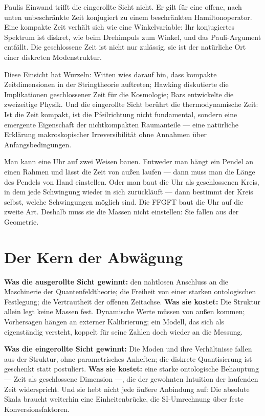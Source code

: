 Paulis Einwand trifft die eingerollte Sicht nicht. Er gilt für eine
offene, nach unten unbeschränkte Zeit konjugiert zu einem beschränkten
Hamiltonoperator. Eine kompakte Zeit verhält sich wie eine
Winkelvariable: Ihr konjugiertes Spektrum ist diskret, wie beim
Drehimpuls zum Winkel, und das Pauli-Argument entfällt. Die
geschlossene Zeit ist nicht nur zulässig, sie ist der natürliche Ort
einer diskreten Modenstruktur.

Diese Einsicht hat Wurzeln: Witten wies darauf hin, dass kompakte
Zeitdimensionen in der Stringtheorie auftreten; Hawking diskutierte die
Implikationen geschlossener Zeit für die Kosmologie; Bars entwickelte
die zweizeitige Physik. Und die eingerollte Sicht berührt die
thermodynamische Zeit: Ist die Zeit kompakt, ist die Pfeilrichtung nicht
fundamental, sondern eine emergente Eigenschaft der nichtkompakten
Raumanteile --- eine natürliche Erklärung makroskopischer
Irreversibilität ohne Annahmen über Anfangsbedingungen.

\begin{laierspur}
Man kann eine Uhr auf zwei Weisen bauen. Entweder man hängt ein
Pendel an einen Rahmen und lässt die Zeit von außen laufen --- dann
muss man die Länge des Pendels von Hand einstellen. Oder man baut die
Uhr als geschlossenen Kreis, in dem jede Schwingung wieder in sich
zurückläuft --- dann bestimmt der Kreis selbst, welche Schwingungen
möglich sind. Die FFGFT baut die Uhr auf die zweite Art. Deshalb muss
sie die Massen nicht einstellen: Sie fallen aus der Geometrie.
\end{laierspur}

\section{Der Kern der Abwägung}

\textbf{Was die ausgerollte Sicht gewinnt:} den nahtlosen Anschluss an
die Maschinerie der Quantenfeldtheorie; die Freiheit von einer starken
ontologischen Festlegung; die Vertrautheit der offenen Zeitachse.
\textbf{Was sie kostet:} Die Struktur allein legt keine Massen fest.
Dynamische Werte müssen von außen kommen; Vorhersagen hängen an
externer Kalibrierung; ein Modell, das sich als eigenständig versteht,
koppelt für seine Zahlen doch wieder an die Messung.

\textbf{Was die eingerollte Sicht gewinnt:} Die Moden und ihre
Verhältnisse fallen aus der Struktur, ohne parametrisches Anheften; die
diskrete Quantisierung ist geschenkt statt postuliert. \textbf{Was sie
kostet:} eine starke ontologische Behauptung --- Zeit als geschlossene
Dimension ---, die der gewohnten Intuition der laufenden Zeit
widerspricht. Und sie hebt nicht jede äußere Anbindung auf: Die absolute
Skala braucht weiterhin eine Einheitenbrücke, die SI-Umrechnung über
feste Konversionsfaktoren.

